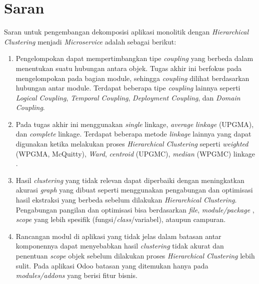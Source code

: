\section{Saran}
Saran  untuk pengembangan dekomposisi aplikasi monolitik dengan \textit{Hierarchical Clustering} menjadi \textit{Microservice} adalah sebagai berikut:
\begin{enumerate}[nolistsep,leftmargin=0.5cm]
    \item  Pengelompokan dapat  mempertimbangkan tipe  \textit{coupling} yang berbeda dalam menentukan suatu hubungan antara objek. Tugas akhir ini berfokus pada mengelompokan pada bagian module, sehingga \textit{coupling} dilihat berdasarkan hubungan antar module. Terdapat beberapa tipe \textit{coupling} lainnya seperti  \textit{Logical Coupling},  \textit{Temporal Coupling},  \textit{Deployment Coupling}, dan  \textit{Domain Coupling}.
    \item Pada tugas akhir ini menggunakan \textit{single} linkage, \textit{average} \textit{linkage} (UPGMA), dan \textit{complete} linkage.  Terdapat beberapa metode \textit{linkage} lainnya yang dapat digunakan ketika melakukan proses \textit{Hierarchical Clustering} seperti \textit{weighted} (WPGMA, McQuitty), \textit{Ward}, \textit{centroid} (UPGMC),  \textit{median} (WPGMC) linkage \cite{09E}. 
    \item Hasil \textit{clustering} yang tidak relevan dapat diperbaiki dengan meningkatkan akurasi \textit{graph} yang dibuat seperti menggunakan pengabungan dan optimisasi hasil ekstraksi yang berbeda sebelum dilakukan \textit{Hierarchical Clustering}. Pengabungan pangilan dan optimisasi  bisa berdasarkan \textit{file}, \textit{module/package} , \textit{scope} yang lebih spesifik (fungsi/\textit{class}/variabel), ataupun campuran.
    \item Rancangan modul di aplikasi yang tidak jelas dalam batasan antar komponennya dapat menyebabkan hasil \textit{clustering} tidak akurat dan penentuan \textit{scope} objek sebelum dilakukan proses \textit{Hierarchical Clustering} lebih sulit. Pada aplikasi Odoo batasan yang ditemukan hanya pada \textit{modules/addons} yang berisi fitur bisnis.
\end{enumerate}

